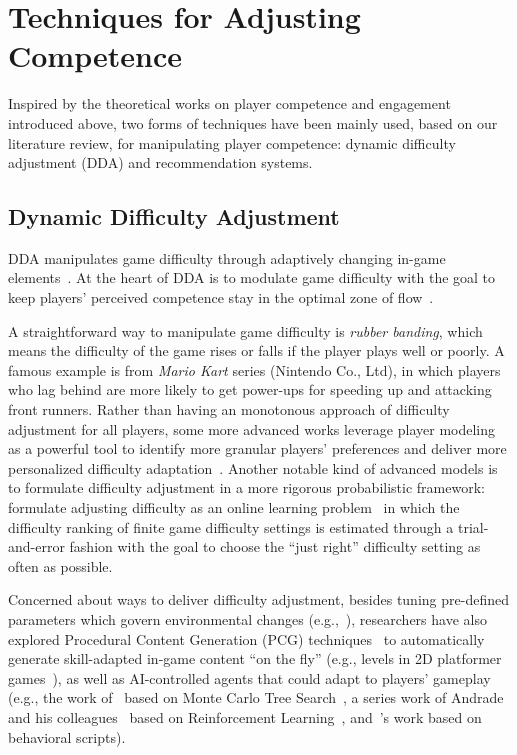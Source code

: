 \section{Techniques for Adjusting Competence}

Inspired by the theoretical works on player competence and  engagement introduced above, two forms of techniques have been mainly used, based on our literature review, for manipulating player competence: dynamic difficulty adjustment (DDA) and recommendation systems.

\subsection{Dynamic Difficulty Adjustment}

DDA manipulates game difficulty through adaptively changing in-game elements~\cite{hunicke2005case}. At the heart of DDA is to modulate game difficulty with the goal to keep players' perceived competence stay in the optimal zone of flow~\cite{flow1990psychology,sweetser2005gameflow,chen2007flow}. 

A straightforward way to manipulate game difficulty is \textit{rubber banding}, which means the difficulty of the game rises or falls if the player plays well or poorly. A famous example is from \textit{Mario Kart} series (Nintendo Co., Ltd), in which players who lag behind are more likely to get power-ups for speeding up and attacking front runners. Rather than having an monotonous approach of difficulty adjustment for all players, some more advanced works leverage player modeling~\cite{yannakakis2013player} as a powerful tool to identify more granular players' preferences and deliver more personalized difficulty adaptation~\cite{missura2009player,togelius2006making,yannakakis2005player,zook2012temporal}. Another notable kind of advanced models is to formulate difficulty adjustment in a more rigorous probabilistic framework: \cite{missura2011predicting} formulate adjusting difficulty as an online learning problem~\cite{auer1995gambling} in which the difficulty ranking of finite game difficulty settings is estimated through a trial-and-error fashion with the goal to choose the ``just right'' difficulty setting as often as possible. 

Concerned about ways to deliver difficulty adjustment, besides tuning pre-defined parameters which govern environmental changes (e.g.,~\cite{hunicke2005case,baldwin2014effect}), researchers have also explored Procedural Content Generation (PCG) techniques~\cite{yannakakis2011experience,togelius2011search} to automatically generate skill-adapted in-game content ``on the fly'' (e.g., levels in 2D platformer games~\cite{jennings2010polymorph}), as well as AI-controlled agents that could adapt to players' gameplay (e.g., the work of~\cite{demediuk2017monte} based on Monte Carlo Tree Search~\cite{browne2012survey}, a series work of Andrade and his colleagues~\cite{andrade2006dynamic,andrade2005challenge,andrade2005extending} based on Reinforcement Learning~\cite{sutton1998reinforcement}, and~\cite{spronck2004difficulty}'s work based on behavioral scripts). 

